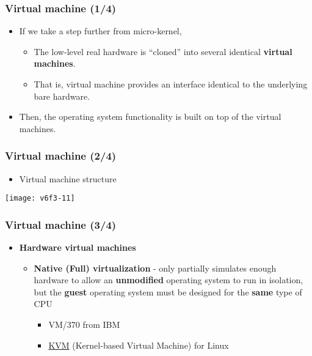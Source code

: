 \documentclass[CJKutf8,xcolor=pdftex,dvipsnames,table]{beamer}
\begin{document}
\begin{CJK*}{UTF8}{song}
  \begin{frame}
    \frametitle{Virtual machine (1/4)} \pause
    \begin{itemize}
    \item{If we take a step further from micro-kernel,} \pause
      \begin{itemize}
      \item{The low-level real hardware is ``cloned'' into several identical \textbf{virtual machines}.} \pause
      \item{That is, virtual machine provides an interface identical to the underlying bare hardware.} \pause
      \end{itemize}
    \item{Then, the operating system functionality is built on top of the virtual machines.}
    \end{itemize}
  \end{frame}
  
  \begin{frame}
    \frametitle{Virtual machine (2/4)} \pause
    \begin{itemize}
    \item{Virtual machine structure} \pause
    \end{itemize}
    \begin{center}
      \texttt{[image: v6f3-11]}
    \end{center}
  \end{frame}

  \begin{frame}
    \frametitle{Virtual machine (3/4)} \pause
    \begin{itemize}
      \item{\textbf{Hardware virtual machines}} \pause
        \begin{itemize}
    		\item{\textbf{Native (Full) virtualization} \pause - only partially simulates enough hardware to allow an \textbf{unmodified} operating system to run in isolation, but the \textbf{guest} operating system must be designed for the \textbf{same} type of CPU} \pause
    			\begin{itemize}
    			\item{VM/370 from IBM} \pause
    			\item{\href{http://www.linux-kvm.org/page/Main\_Page}{KVM} (Kernel-based Virtual Machine) for Linux} \pause
    			\end{itemize}
			

\end{itemize}
\end{itemize}
\end{frame}
\end{CJK*}
\end{document}
